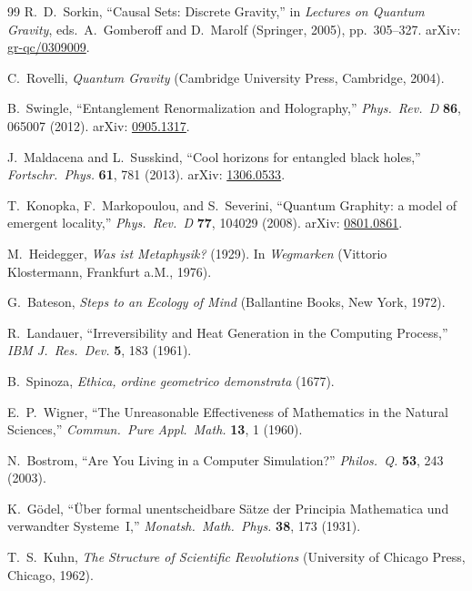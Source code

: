 \documentclass[12pt,a4paper,twoside]{article}
\theoremstyle{plain}
\theoremstyle{definition}
\theoremstyle{remark}
\begin{document}
\begin{thebibliography}{99}
R.~D.~Sorkin,
``Causal Sets: Discrete Gravity,''
in \emph{Lectures on Quantum Gravity}, eds.\ A.~Gomberoff and D.~Marolf
(Springer, 2005), pp.~305--327.
arXiv: \href{https://arxiv.org/abs/gr-qc/0309009}{gr-qc/0309009}.

C.~Rovelli,
\emph{Quantum Gravity} (Cambridge University Press, Cambridge, 2004).

B.~Swingle,
``Entanglement Renormalization and Holography,''
\emph{Phys.\ Rev.\ D} \textbf{86}, 065007 (2012).
arXiv: \href{https://arxiv.org/abs/0905.1317}{0905.1317}.

J.~Maldacena and L.~Susskind,
``Cool horizons for entangled black holes,''
\emph{Fortschr.\ Phys.} \textbf{61}, 781 (2013).
arXiv: \href{https://arxiv.org/abs/1306.0533}{1306.0533}.

T.~Konopka, F.~Markopoulou, and S.~Severini,
``Quantum Graphity: a model of emergent locality,''
\emph{Phys.\ Rev.\ D} \textbf{77}, 104029 (2008).
arXiv: \href{https://arxiv.org/abs/0801.0861}{0801.0861}.

M.~Heidegger,
\emph{Was ist Metaphysik?} (1929).
In \emph{Wegmarken} (Vittorio Klostermann, Frankfurt a.M., 1976).

G.~Bateson,
\emph{Steps to an Ecology of Mind} (Ballantine Books, New York, 1972).

R.~Landauer,
``Irreversibility and Heat Generation in the Computing Process,''
\emph{IBM J.\ Res.\ Dev.} \textbf{5}, 183 (1961).

B.~Spinoza,
\emph{Ethica, ordine geometrico demonstrata} (1677).

E.~P.~Wigner,
``The Unreasonable Effectiveness of Mathematics in the Natural Sciences,''
\emph{Commun.\ Pure Appl.\ Math.} \textbf{13}, 1 (1960).

N.~Bostrom,
``Are You Living in a Computer Simulation?''
\emph{Philos.\ Q.} \textbf{53}, 243 (2003).

K.~G\"odel,
``\"Uber formal unentscheidbare S\"atze der Principia Mathematica
und verwandter Systeme~I,''
\emph{Monatsh.\ Math.\ Phys.} \textbf{38}, 173 (1931).

T.~S.~Kuhn,
\emph{The Structure of Scientific Revolutions}
(University of Chicago Press, Chicago, 1962).


\end{thebibliography}
\end{document}
